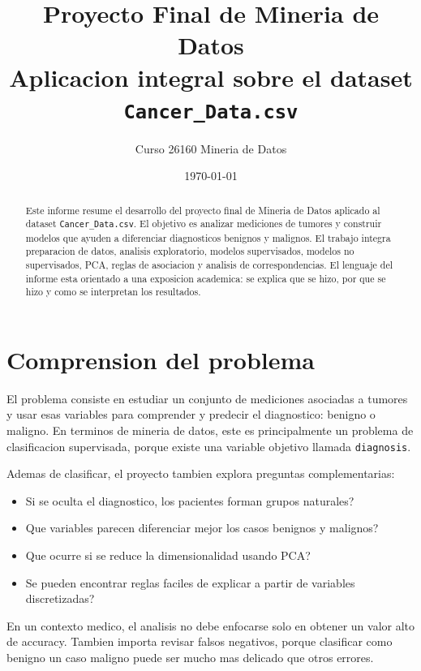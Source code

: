 \documentclass[12pt,letterpaper]{article}
\title{\textbf{Proyecto Final de Mineria de Datos}\\
\large Aplicacion integral sobre el dataset \texttt{Cancer\_Data.csv}}
\author{Curso 26160 Mineria de Datos}
\date{\today}
\begin{document}
\maketitle

\begin{abstract}
Este informe resume el desarrollo del proyecto final de Mineria de Datos aplicado al dataset \texttt{Cancer\_Data.csv}. El objetivo es analizar mediciones de tumores y construir modelos que ayuden a diferenciar diagnosticos benignos y malignos. El trabajo integra preparacion de datos, analisis exploratorio, modelos supervisados, modelos no supervisados, PCA, reglas de asociacion y analisis de correspondencias. El lenguaje del informe esta orientado a una exposicion academica: se explica que se hizo, por que se hizo y como se interpretan los resultados.
\end{abstract}

\tableofcontents
\newpage

\section{Comprension del problema}

El problema consiste en estudiar un conjunto de mediciones asociadas a tumores y usar esas variables para comprender y predecir el diagnostico: benigno o maligno. En terminos de mineria de datos, este es principalmente un problema de clasificacion supervisada, porque existe una variable objetivo llamada \texttt{diagnosis}.

Ademas de clasificar, el proyecto tambien explora preguntas complementarias:

\begin{itemize}[leftmargin=*]
    \item Si se oculta el diagnostico, \textquestiondown los pacientes forman grupos naturales?
    \item \textquestiondown Que variables parecen diferenciar mejor los casos benignos y malignos?
    \item \textquestiondown Que ocurre si se reduce la dimensionalidad usando PCA?
    \item \textquestiondown Se pueden encontrar reglas faciles de explicar a partir de variables discretizadas?
\end{itemize}

En un contexto medico, el analisis no debe enfocarse solo en obtener un valor alto de accuracy. Tambien importa revisar falsos negativos, porque clasificar como benigno un caso maligno puede ser mucho mas delicado que otros errores.
\end{document}
